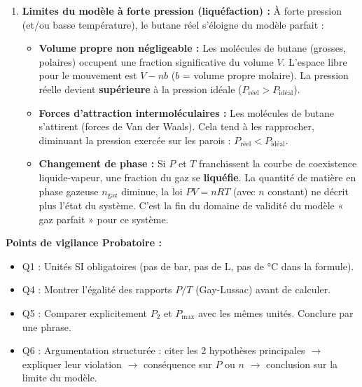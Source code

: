 \documentclass[11pt]{article}
\begin{document}
\begin{corrige}
\begin{enumerate}
      $P_2 = \SI{1,06e6}{Pa} < P_{\max}$.
      \textbf{Conclusion :} Dans cette situation précise ($t_2 = \SI{47}{\degreeCelsius}$), la pression calculée (\SI{10,6}{bar}) reste \textbf{inférieure} à la pression maximale de rupture (\SI{15}{bar}). Il n'y a \textbf{pas de danger immédiat de rupture} de la bouteille.
      \textit{Nuance :} La soupape de sécurité est souvent tarée plus bas (ex. \SI{15}{bar} à \SI{25}{bar}), mais la marge de sécurité se réduit. Une température plus élevée (incendie) ferait dépasser $P_{\max}$.
\item \textbf{Limites du modèle à forte pression (liquéfaction) :}
      À forte pression (et/ou basse température), le butane réel s'éloigne du modèle parfait :
      \begin{itemize}
      \item \textbf{Volume propre non négligeable :} Les molécules de butane (grosses, polaires) occupent une fraction significative du volume $V$. L'espace libre pour le mouvement est $V - nb$ ($b$ = volume propre molaire). La pression réelle devient \textbf{supérieure} à la pression idéale ($P_{\text{réel}} > P_{\text{idéal}}$).
      \item \textbf{Forces d'attraction intermoléculaires :} Les molécules de butane s'attirent (forces de Van der Waals). Cela tend à les rapprocher, diminuant la pression exercée sur les parois : $P_{\text{réel}} < P_{\text{idéal}}$.
      \item \textbf{Changement de phase :} Si $P$ et $T$ franchissent la courbe de coexistence liquide-vapeur, une fraction du gaz se \textbf{liquéfie}. La quantité de matière en phase gazeuse $n_{\text{gaz}}$ diminue, la loi $PV=nRT$ (avec $n$ constant) ne décrit plus l'état du système. C'est la fin du domaine de validité du modèle « gaz parfait » pour ce système.
      \end{itemize}
\end{enumerate}
\textbf{Points de vigilance Probatoire :}
\begin{itemize}
\item Q1 : Unités SI obligatoires (pas de bar, pas de L, pas de °C dans la formule).
\item Q4 : Montrer l'égalité des rapports $P/T$ (Gay-Lussac) avant de calculer.
\item Q5 : Comparer explicitement $P_2$ et $P_{\max}$ avec les mêmes unités. Conclure par une phrase.
\item Q6 : Argumentation structurée : citer les 2 hypothèses principales $\to$ expliquer leur violation $\to$ conséquence sur $P$ ou $n$ $\to$ conclusion sur la limite du modèle.
\end{itemize}
\end{corrige}
\end{document}
